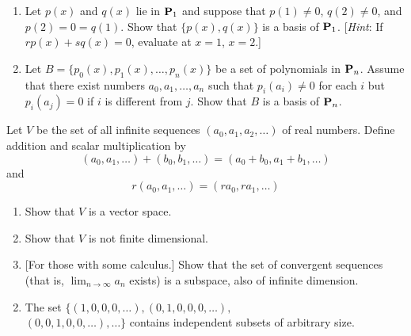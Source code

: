 \begin{multicols}{2}
\begin{ex}
\begin{enumerate}[label={\alph*.}]
\item Let $p(x)$ and $q(x)$ lie in $\textbf{P}_{1}$ and suppose that $p(1) \neq 0$, $q(2) \neq 0$, and $p(2) = 0 = q(1)$. Show that $\{p(x), q(x)\}$ is a basis of $\textbf{P}_{1}$. [\textit{Hint}: If $rp(x) + sq(x) = 0$, evaluate at $x = 1$, $x = 2$.]

\item Let $B = \{p_{0}(x), p_{1}(x), \dots, p_{n}(x)\}$ be a set of polynomials in $\textbf{P}_{n}$. Assume that there exist numbers $a_{0}, a_{1}, \dots, a_{n}$ such that $p_{i}(a_{i}) \neq 0$ for each $i$ but $p_{i}(a_{j}) = 0$ if $i$ is different from $j$. Show that $B$ is a basis of $\textbf{P}_{n}$.

\end{enumerate}
\end{ex}

\begin{ex}
Let $V$ be the set of all infinite sequences $(a_{0}, a_{1}, a_{2}, \dots)$ of real numbers. Define addition and scalar multiplication by 
\begin{equation*}
(a_{0}, a_{1}, \dots) + (b_{0}, b_{1}, \dots) = (a_{0} + b_{0}, a_{1} + b_{1}, \dots)
\end{equation*}
and 
\begin{equation*}
r(a_{0}, a_{1}, \dots) = (ra_{0}, {ra}_{1}, \dots)
\end{equation*}

\begin{enumerate}[label={\alph*.}]
\item Show that $V$ is a vector space.

\item Show that $V$ is not finite dimensional.

\item {[For those with some calculus.]} Show that the set of convergent sequences (that is, $\displaystyle \lim_{n \to \infty} a_{n}$ exists) is a subspace, also of infinite dimension.

\end{enumerate}
\begin{sol}
\begin{enumerate}[label={\alph*.}]
\setcounter{enumi}{1}
\item  The set $\{(1, 0, 0, 0, \dots), (0, 1, 0, 0, 0, \dots),$ \\$(0, 0, 1, 0, 0, \dots), \dots\}$ contains independent subsets of arbitrary size.


\end{enumerate}
\end{sol}
\end{ex}
\end{multicols}
